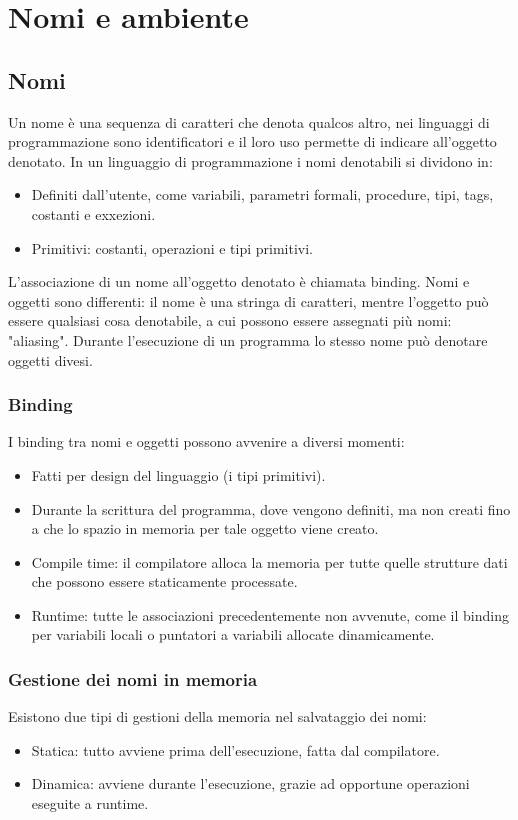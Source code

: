 \chapter{Nomi e ambiente}
\section{Nomi}
Un nome \`e una sequenza di caratteri che denota qualcos altro, nei linguaggi di programmazione sono identificatori e il loro uso permette di indicare all'oggetto denotato.
In un linguaggio di programmazione i nomi denotabili si dividono in:
\begin{itemize}
\item Definiti dall'utente, come variabili, parametri formali, procedure, tipi, tags, costanti e exxezioni.
\item Primitivi: costanti, operazioni e tipi primitivi.
\end{itemize}
L'associazione di un nome all'oggetto denotato \`e chiamata binding. Nomi e oggetti sono differenti: il nome \`e una stringa di caratteri, mentre l'oggetto pu\`o essere
qualsiasi cosa denotabile, a cui possono essere assegnati pi\`u nomi: "aliasing". Durante l'esecuzione di un programma lo stesso nome pu\`o denotare oggetti divesi.
\subsection{Binding}
I binding tra nomi e oggetti possono avvenire a diversi momenti: 
\begin{itemize}
\item Fatti per design del linguaggio (i tipi primitivi).
\item Durante la scrittura del programma, dove vengono definiti, ma non creati fino a che lo spazio in memoria per tale oggetto viene creato. 
\item Compile time: il compilatore alloca la memoria per tutte quelle strutture dati che possono essere staticamente processate.
\item Runtime: tutte le associazioni precedentemente non avvenute, come il binding per variabili locali o puntatori a variabili allocate dinamicamente.  
\end{itemize} 
\subsection{Gestione dei nomi in memoria}
Esistono due tipi di gestioni della memoria nel salvataggio dei nomi:
\begin{itemize}
\item Statica: tutto avviene prima dell'esecuzione, fatta dal compilatore.
\item Dinamica: avviene durante l'esecuzione, grazie ad opportune operazioni eseguite a runtime.
\end{itemize}
